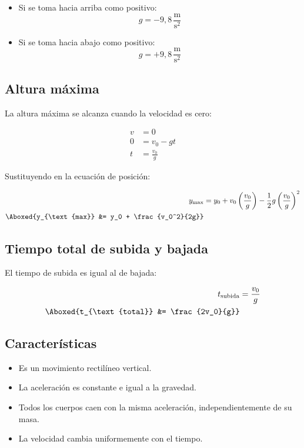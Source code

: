 \begin{itemize}
    \setlength{\itemsep}{0pt}
    \item Si se toma hacia arriba como positivo:
    \[
    g = -9{,}8\,\frac{\text{m}}{\text{s}^2}
    \]
    \item Si se toma hacia abajo como positivo:
    \[
    g = +9{,}8\,\frac{\text{m}}{\text{s}^2}
    \]
\end{itemize}

\subsection{Altura máxima}

La altura máxima se alcanza cuando la velocidad es cero:

\vspace{-30pt}
\begin{align*}
v &= 0 \\
0 &= v_0 - gt \\
t &= \frac{v_0}{g}
\end{align*}

Sustituyendo en la ecuación de posición:

\vspace{-20pt}

\begin{align*}
y_{\text{max}} &= y_0 + v_0\left(\frac{v_0}{g}\right) - \frac{1}{2}g\left(\frac{v_0}{g}\right)^2 \\
\Aboxed{y_{\text{max}} &= y_0 + \frac{v_0^2}{2g}}
\end{align*}

\subsection{Tiempo total de subida y bajada}

El tiempo de subida es igual al de bajada:

\vspace{-20pt}

\begin{align*}
t_{\text{subida}} &= \frac{v_0}{g} \\
\Aboxed{t_{\text{total}} &= \frac{2v_0}{g}}
\end{align*}

\subsection{Características}

\begin{itemize}
    \setlength{\itemsep}{0pt}
    \item Es un movimiento rectilíneo vertical.
    \item La aceleración es constante e igual a la gravedad.
    \item Todos los cuerpos caen con la misma aceleración, independientemente de su masa.
    \item La velocidad cambia uniformemente con el tiempo.
\end{itemize}